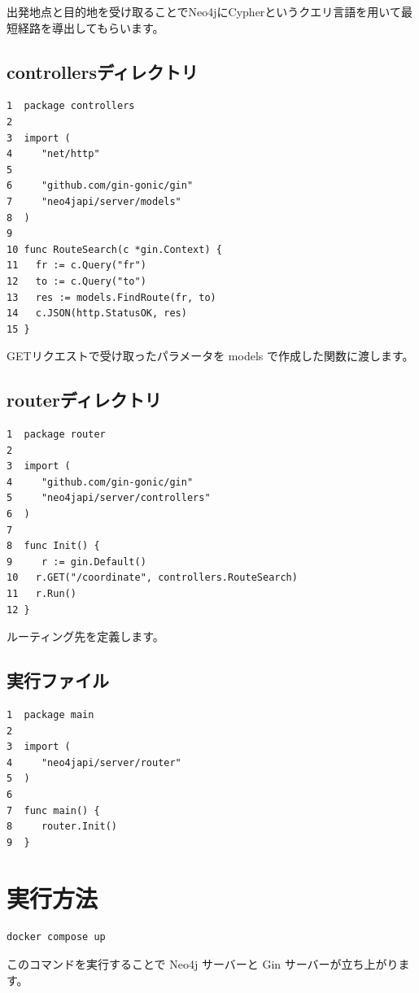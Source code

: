 出発地点と目的地を受け取ることでNeo4jにCypherというクエリ言語を用いて最短経路を導出してもらいます。
\subsection{controllersディレクトリ}

\begin{tcolorbox}[title=coordinate\_controller.go]
\begin{verbatim}
1  package controllers
2
3  import (
4	  "net/http"
5
6	  "github.com/gin-gonic/gin"
7	  "neo4japi/server/models"
8  )
9
10 func RouteSearch(c *gin.Context) {
11	 fr := c.Query("fr")
12	 to := c.Query("to")
13	 res := models.FindRoute(fr, to)
14	 c.JSON(http.StatusOK, res)
15 }
\end{verbatim}
\end{tcolorbox}
GETリクエストで受け取ったパラメータを models で作成した関数に渡します。
\subsection{routerディレクトリ}

\begin{tcolorbox}[title=router.go]
\begin{verbatim}
1  package router
2
3  import (
4	  "github.com/gin-gonic/gin"
5	  "neo4japi/server/controllers"
6  )
7
8  func Init() {
9	  r := gin.Default()
10	 r.GET("/coordinate", controllers.RouteSearch)
11	 r.Run()
12 }
\end{verbatim}
\end{tcolorbox}
ルーティング先を定義します。
\subsection{実行ファイル}
\begin{tcolorbox}[title=coordinate\_controller.go]
\begin{verbatim}
1  package main
2
3  import (
4	  "neo4japi/server/router"
5  )
6
7  func main() {
8	  router.Init()
9  }
\end{verbatim}
\end{tcolorbox}

\section{実行方法}
\begin{tcolorbox}[breakable]
\begin{verbatim}
docker compose up
\end{verbatim}
\end{tcolorbox}
このコマンドを実行することで Neo4j サーバーと Gin サーバーが立ち上がります。
